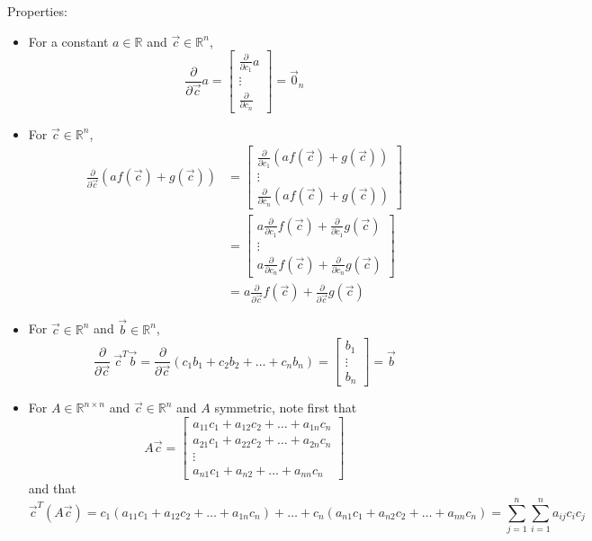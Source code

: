 \documentclass[12pt]{article}
\begin{document}
Properties: \begin{itemize}
\item For a constant $a \in \mathbb{R}$ and $\vec{c} \in \mathbb{R}^n$, $$ \frac{\partial}{\partial \vec{c}} a = \begin{bmatrix} \frac{\partial}{\partial c_1} a \\ \vdots \\ \frac{\partial}{\partial c_n} \end{bmatrix} = \vec{0}_n$$ 
\item For $\vec{c} \in \mathbb{R}^n$, $$ \begin{aligned} \frac{\partial}{\partial \vec{c}} (af(\vec{c}) + g(\vec{c})) &= \begin{bmatrix} \frac{\partial}{\partial c_1} (af(\vec{c}) + g(\vec{c})) \\ \vdots \\ \frac{\partial}{\partial c_n} (af(\vec{c}) + g(\vec{c})) \end{bmatrix} \\ 
&= \begin{bmatrix} a\frac{\partial}{\partial c_1} f(\vec{c}) + \frac{\partial}{\partial c_1} g(\vec{c}) \\ \vdots \\ a\frac{\partial}{\partial c_n} f(\vec{c}) + \frac{\partial}{\partial c_n} g(\vec{c}) \end{bmatrix} \\ 
&= a\frac{\partial}{\partial{\vec{c}}} f(\vec{c}) + \frac{\partial}{\partial \vec{c}} g(\vec{c}) \end{aligned} $$ 
\item For $\vec{c} \in \mathbb{R}^n$ and $\vec{b} \in \mathbb{R}^n$, 
$$ \frac{\partial}{\partial \vec{c}} ~\vec{c}^T\vec{b} = \frac{\partial}{\partial \vec{c}} (c_1b_1 + c_2b_2 + \dots + c_nb_n) = \begin{bmatrix} b_1 \\ \vdots \\ b_n \end{bmatrix} = \vec{b} $$ 
\item For $A \in \mathbb{R}^{n\times n}$ and $\vec{c} \in \mathbb{R}^n$ and $A$ symmetric, note first that $$ A\vec{c} = \begin{bmatrix} a_{11}c_1 + a_{12}c_2 + \dots + a_{1n}c_n \\ a_{21}c_1 + a_{22}c_2 + \dots + a_{2n}c_n \\ \vdots \\ a_{n1}c_1 +a_{n2} + \dots + a_{nn}c_n \end{bmatrix}$$ and that $$ \vec{c}^T(A\vec{c}) = c_1(a_{11}c_1 + a_{12}c_2 + \dots + a_{1n}c_n) + \dots + c_n(a_{n1}c_1 + a_{n2}c_2 + \dots + a_{nn}c_n) = \sum_{j=1}^n\sum_{i=1}^n a_{ij}c_ic_j$$

\end{itemize}
\end{document}
